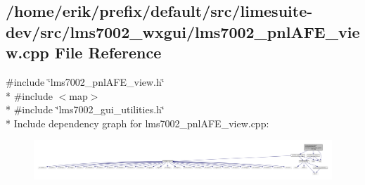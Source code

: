 \subsection{/home/erik/prefix/default/src/limesuite-\/dev/src/lms7002\+\_\+wxgui/lms7002\+\_\+pnl\+A\+F\+E\+\_\+view.cpp File Reference}
\label{lms7002__pnlAFE__view_8cpp}
{\ttfamily \#include \char`\"{}lms7002\+\_\+pnl\+A\+F\+E\+\_\+view.\+h\char`\"{}}\\*
{\ttfamily \#include $<$map$>$}\\*
{\ttfamily \#include \char`\"{}lms7002\+\_\+gui\+\_\+utilities.\+h\char`\"{}}\\*
Include dependency graph for lms7002\+\_\+pnl\+A\+F\+E\+\_\+view.\+cpp\+:
\nopagebreak
\begin{figure}[H]
\begin{center}
\leavevmode
\includegraphics[width=350pt]{d5/d68/lms7002__pnlAFE__view_8cpp__incl}
\end{center}
\end{figure}
